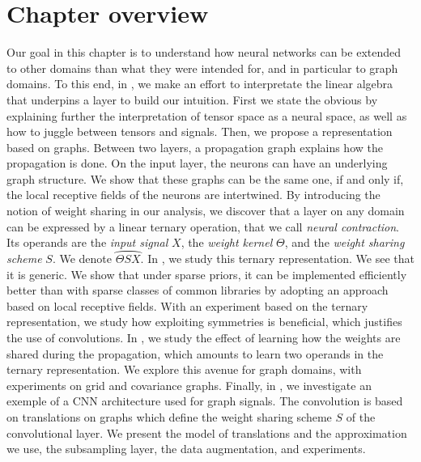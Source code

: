 \section*{Chapter overview}

Our goal in this chapter is to understand how neural networks can be extended to other domains than what they were intended for, and in particular to graph domains. To this end, in , we make an effort to interpretate the linear algebra that underpins a layer to build our intuition. First we state the obvious by explaining further the interpretation of tensor space as a neural space, as well as how to juggle between tensors and signals. Then, we propose a representation based on graphs. Between two layers, a propagation graph explains how the propagation is done. On the input layer, the neurons can have an underlying graph structure. We show that these graphs can be the same one, if and only if, the local receptive fields of the neurons are intertwined. By introducing the notion of weight sharing in our analysis, we discover that a layer on any domain can be expressed by a linear ternary operation, that we call \emph{neural contraction}. Its operands are the \emph{input signal} $X$, the \emph{weight kernel} $\Theta$, and the \emph{weight sharing scheme} $S$. We denote $\wideparen{\Theta S X}$. In , we study this ternary representation. We see that it is generic. We show that under sparse priors, it can be implemented efficiently better than with sparse classes of common libraries by adopting an approach based on local receptive fields. With an experiment based on the ternary representation, we study how exploiting symmetries is beneficial, which justifies the use of convolutions. In , we study the effect of learning how the weights are shared during the propagation, which amounts to learn two operands in the ternary representation. We explore this avenue for graph domains, with experiments on grid and covariance graphs. Finally, in , we investigate an exemple of a CNN architecture used for graph signals. The convolution is based on translations on graphs which define the weight sharing scheme $S$ of the convolutional layer. We present the model of translations and the approximation we use, the subsampling layer, the data augmentation, and experiments.
